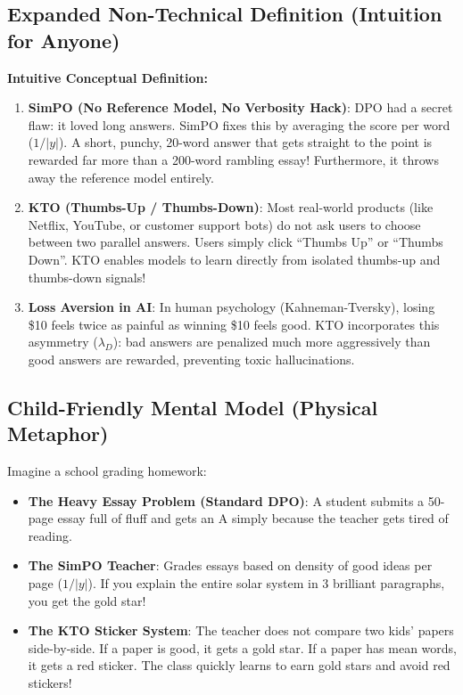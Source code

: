 \documentclass[11pt,a4paper]{article}
\theoremstyle{definition}
\begin{document}
\subsection{Expanded Non-Technical Definition (Intuition for Anyone)}
\textbf{Intuitive Conceptual Definition:}
\begin{enumerate}
    \item \textbf{SimPO (No Reference Model, No Verbosity Hack)}: DPO had a secret flaw: it loved long answers. SimPO fixes this by averaging the score per word ($1/|y|$). A short, punchy, 20-word answer that gets straight to the point is rewarded far more than a 200-word rambling essay! Furthermore, it throws away the reference model entirely.
    \item \textbf{KTO (Thumbs-Up / Thumbs-Down)}: Most real-world products (like Netflix, YouTube, or customer support bots) do not ask users to choose between two parallel answers. Users simply click ``Thumbs Up'' or ``Thumbs Down''. KTO enables models to learn directly from isolated thumbs-up and thumbs-down signals!
    \item \textbf{Loss Aversion in AI}: In human psychology (Kahneman-Tversky), losing \$10 feels twice as painful as winning \$10 feels good. KTO incorporates this asymmetry ($\lambda_D$): bad answers are penalized much more aggressively than good answers are rewarded, preventing toxic hallucinations.
\end{enumerate}

\subsection{Child-Friendly Mental Model (Physical Metaphor)}
Imagine a school grading homework:
\begin{itemize}
    \item \textbf{The Heavy Essay Problem (Standard DPO)}: A student submits a 50-page essay full of fluff and gets an A simply because the teacher gets tired of reading.
    \item \textbf{The SimPO Teacher}: Grades essays based on density of good ideas per page ($1/|y|$). If you explain the entire solar system in 3 brilliant paragraphs, you get the gold star!
    \item \textbf{The KTO Sticker System}: The teacher does not compare two kids' papers side-by-side. If a paper is good, it gets a gold star. If a paper has mean words, it gets a red sticker. The class quickly learns to earn gold stars and avoid red stickers!
\end{itemize}
\end{document}
